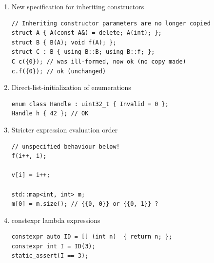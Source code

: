 \documentclass[12pt]{article}
\begin{document}
{\begin{enumerate}
\begin{lstlisting}
int main() {  
    auto &&foo = f();
}
\end{lstlisting}
\item New specification for inheriting constructors
\begin{lstlisting}
// Inheriting constructor parameters are no longer copied
struct A { A(const A&) = delete; A(int); };
struct B { B(A); void f(A); };
struct C : B { using B::B; using B::f; };
C c({0}); // was ill-formed, now ok (no copy made)
c.f({0}); // ok (unchanged)
\end{lstlisting}
\item Direct-list-initialization of enumerations
\begin{lstlisting}
enum class Handle : uint32_t { Invalid = 0 };
Handle h { 42 }; // OK
\end{lstlisting}
\item Stricter expression evaluation order
\begin{lstlisting}
// unspecified behaviour below!
f(i++, i);

v[i] = i++;

std::map<int, int> m;
m[0] = m.size(); // {{0, 0}} or {{0, 1}} ?
\end{lstlisting}
\item constexpr lambda expressions
\begin{lstlisting}
constexpr auto ID = [] (int n)  { return n; };
constexpr int I = ID(3);
static_assert(I == 3);


\end{lstlisting}
\end{enumerate}}
\end{document}
